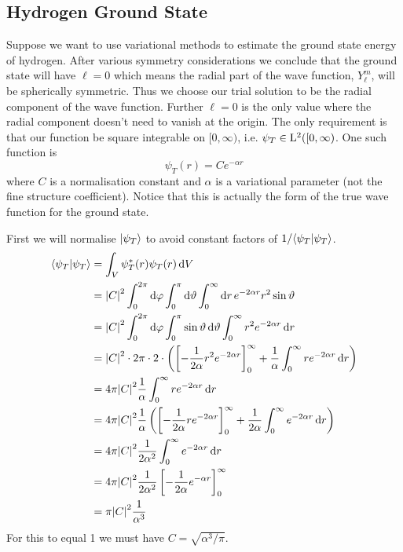     \subsection{Hydrogen Ground State}
    Suppose we want to use variational methods to estimate the ground state energy of hydrogen.
    After various symmetry considerations we conclude that the ground state will have \(\ell = 0\) which means the radial part of the wave function, \(Y_\ell^m\), will be spherically symmetric.
    Thus we choose our trial solution to be the radial component of the wave function.
    Further \(\ell = 0\) is the only value where the radial component doesn't need to vanish at the origin.
    The only requirement is that our function be square integrable on \([0, \infty)\), i.e. \(\psi_T\in \operatorname{L^2}([0, \infty)\).
    One such function is
    \[\psi_T(r) = Ce^{-\alpha r}\]
    where \(C\) is a normalisation constant and \(\alpha\) is a variational parameter (not the fine structure coefficient).
    Notice that this is actually the form of the true wave function for the ground state.
    
    First we will normalise \(\vert {\psi_T} \rangle\) to avoid constant factors of \(1/\langle {\psi_T} \vert {\psi_T} \rangle\).
    \begin{align*}
        \langle {\psi_T} \vert {\psi_T} \rangle &= \int_V \psi_T^*(r)\psi_T(r) \dd{V}\\
        &= \abs{C}^2 \int_{0}^{2\pi} \dd{\varphi} \int_{0}^{\pi} \dd{\vartheta} \int_{0}^{\infty} \dd{r} e^{-2\alpha r}r^2\sin\vartheta\\
        &= \abs{C}^2\int_0^{2\pi}\dd{\varphi} \int_0^{\pi} \sin\vartheta \dd{\vartheta} \int_0^{\infty} r^2e^{-2\alpha r} \dd{r}\\
        &= \abs{C}^2\cdot2\pi\cdot 2 \cdot \left(\left[-\frac{1}{2\alpha} r^2e^{-2\alpha r}\right]_0^{\infty} + \frac{1}{\alpha}\int_0^{\infty} re^{-2\alpha r} \dd{r}\right)\\
        &= 4\pi\abs{C}^2 \frac{1}{\alpha} \int_0^{\infty} re^{-2\alpha r} \dd{r}\\
        &= 4\pi\abs{C}^2 \frac{1}{\alpha} \left(\left[-\frac{1}{2\alpha} re^{-2\alpha r}\right]_0^{\infty} + \frac{1}{2\alpha} \int_0^{\infty} e^{-2\alpha r} \dd{r}\right)\\
        &= 4\pi\abs{C}^2\frac{1}{2\alpha^2} \int_0^{\infty} e^{-2\alpha r} \dd{r}\\
        &= 4\pi\abs{C}^2\frac{1}{2\alpha^2} \left[-\frac{1}{2\alpha}e^{-\alpha r}\right]_0^{\infty}\\
        &= \pi\abs{C}^2\frac{1}{\alpha^3}
    \end{align*}
    For this to equal 1 we must have \(C = \sqrt{\alpha^3/\pi}\).
    
